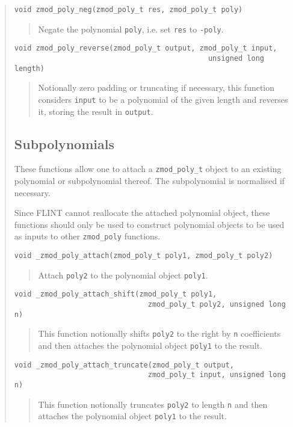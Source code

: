 \documentclass[a4paper,10pt]{article}
\newcommand{\code}{\lstinline}
\begin{document}
\begin{quote}
\begin{lstlisting}
void zmod_poly_neg(zmod_poly_t res, zmod_poly_t poly)
\end{lstlisting}
\begin{quote}
Negate the polynomial \code{poly}, i.e. set \code{res} to \code{-poly}.
\end{quote}

\begin{lstlisting}
void zmod_poly_reverse(zmod_poly_t output, zmod_poly_t input,
                                             unsigned long length)
\end{lstlisting}
\begin{quote}
Notionally zero padding or truncating if necessary, this function considers \code{input} to be a polynomial of the given length and reverses it, storing the result in \code{output}.
\end{quote}

\subsection{Subpolynomials}
These functions allow one to attach a \code{zmod_poly_t} object to an existing polynomial or subpolynomial thereof. The subpolynomial is normalised if necessary.

Since FLINT cannot reallocate the attached polynomial object, these functions should only be used to construct polynomial objects to be used as inputs to other \code{zmod_poly} functions.

\begin{lstlisting}
void _zmod_poly_attach(zmod_poly_t poly1, zmod_poly_t poly2)
\end{lstlisting}
\begin{quote}
Attach \code{poly2} to the polynomial object \code{poly1}.
\end{quote}

\begin{lstlisting}
void _zmod_poly_attach_shift(zmod_poly_t poly1, 
                               zmod_poly_t poly2, unsigned long n)
\end{lstlisting}
\begin{quote}
This function notionally shifts \code{poly2} to the right by \code{n} coefficients and then attaches the polynomial object \code{poly1} to the result.
\end{quote}

\begin{lstlisting}
void _zmod_poly_attach_truncate(zmod_poly_t output, 
                               zmod_poly_t input, unsigned long n)
\end{lstlisting}
\begin{quote}
This function notionally truncates \code{poly2} to length \code{n} and then attaches the polynomial object \code{poly1} to the result.
\end{quote}


\end{quote}
\end{document}
